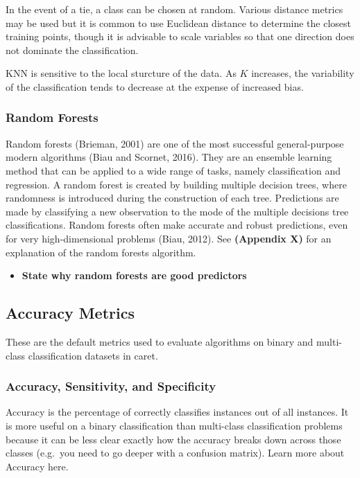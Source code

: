 \documentclass[12pt,]{article}
\providecommand{\tightlist}{%
  \setlength{\itemsep}{0pt}\setlength{\parskip}{0pt}}
\begin{document}
In the event of a tie, a class can be chosen at random. Various distance
metrics may be used but it is common to use Euclidean distance to
determine the closest training points, though it is advisable to scale
variables so that one direction does not dominate the classification.

KNN is sensitive to the local sturcture of the data. As \(K\) increases,
the variability of the classification tends to decrease at the expense
of increased bias.

\subsubsection{Random Forests}\label{random-forests}

Random forests (Brieman, 2001) are one of the most successful
general-purpose modern algorithms (Biau and Scornet, 2016). They are an
ensemble learning method that can be applied to a wide range of tasks,
namely classification and regression. A random forest is created by
building multiple decision trees, where randomness is introduced during
the construction of each tree. Predictions are made by classifying a new
observation to the mode of the multiple decisions tree classifications.
Random forests often make accurate and robust predictions, even for very
high-dimensional problems (Biau, 2012). See \textbf{(Appendix X)} for an
explanation of the random forests algorithm.

\begin{itemize}
\tightlist
\item
  \textbf{State why random forests are good predictors}
\end{itemize}

\subsection{Accuracy Metrics}\label{accuracy-metrics}

These are the default metrics used to evaluate algorithms on binary and
multi-class classification datasets in caret.

\subsubsection{Accuracy, Sensitivity, and
Specificity}\label{accuracy-sensitivity-and-specificity}

Accuracy is the percentage of correctly classifies instances out of all
instances. It is more useful on a binary classification than multi-class
classification problems because it can be less clear exactly how the
accuracy breaks down across those classes (e.g.~you need to go deeper
with a confusion matrix). Learn more about Accuracy here.
\end{document}
